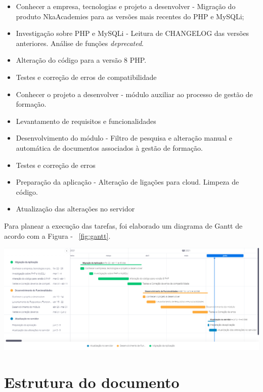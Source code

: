 \begin{itemize}
    \item  Conhecer a empresa, tecnologias e projeto a desenvolver - Migração do produto NkaAcademies para as versões mais recentes do PHP e MySQLi;
    \item  Investigação sobre PHP e MySQLi - Leitura de CHANGELOG das versões anteriores. Análise de funções \textit{deprecated}.
    \item  Alteração do código para a versão 8 PHP.
    \item  Testes e correção de erros de compatibilidade
    \item  Conhecer o projeto a desenvolver - módulo auxiliar ao processo de gestão de formação.
    \item Levantamento de requisitos e funcionalidades
    \item  Desenvolvimento do módulo - Filtro de pesquisa e alteração manual e automática de documentos associados à gestão de formação.
    \item Testes e correção de erros
    \item  Preparação da aplicação - Alteração de ligações para cloud. Limpeza de código.
    \item Atualização das alterações no servidor
\end{itemize}
Para planear a execução das tarefas, foi elaborado um diagrama de Gantt de acordo com a Figura - ~\ref{fig:gantt}.

\begin{center}
        \includegraphics[width=\textwidth,height=\textheight,keepaspectratio]{images/unknown.png}
        \label{fig:gantt}
\end{center}


\section{Estrutura do documento}


